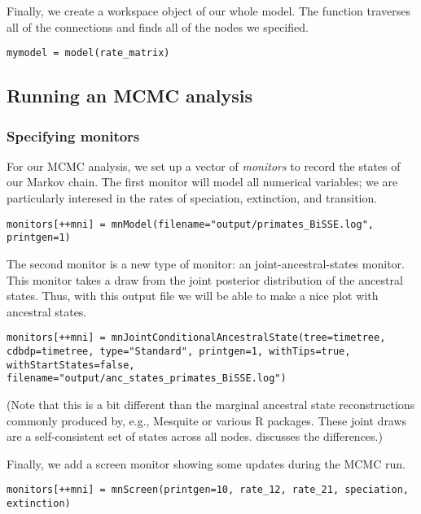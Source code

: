 Finally, we create a workspace object of our whole model.
The  function traverses all of the connections and finds all of the nodes we specified.
{\tt \begin{snugshade*}
\begin{lstlisting}
mymodel = model(rate_matrix)
\end{lstlisting}
\end{snugshade*}}

\subsection{Running an MCMC analysis}

\subsubsection{Specifying monitors}

For our MCMC analysis, we set up a vector of \emph{monitors} to record the states of our Markov chain. 
The first monitor will model all numerical variables; we are particularly interesed in the rates of speciation, extinction, and transition.
{\tt \begin{snugshade*}
\begin{lstlisting}
monitors[++mni] = mnModel(filename="output/primates_BiSSE.log", printgen=1)
\end{lstlisting}
\end{snugshade*}}

The second monitor is a new type of monitor: an joint-ancestral-states monitor.
This monitor takes a draw from the joint posterior distribution of the ancestral states.
Thus, with this output file we will be able to make a nice plot with ancestral states.
{\tt \begin{snugshade*}
\begin{lstlisting}
monitors[++mni] = mnJointConditionalAncestralState(tree=timetree, cdbdp=timetree, type="Standard", printgen=1, withTips=true, withStartStates=false, filename="output/anc_states_primates_BiSSE.log")
\end{lstlisting}
\end{snugshade*}}
(Note that this is a bit different than the marginal ancestral state reconstructions commonly produced by, e.g., Mesquite or various R packages.
These joint draws are a self-consistent set of states across all nodes.
\citet{Pagel1999} discusses the differences.)

Finally, we add a screen monitor showing some updates during the MCMC run.
{\tt \begin{snugshade*}
\begin{lstlisting}
monitors[++mni] = mnScreen(printgen=10, rate_12, rate_21, speciation, extinction)
\end{lstlisting}
\end{snugshade*}}

